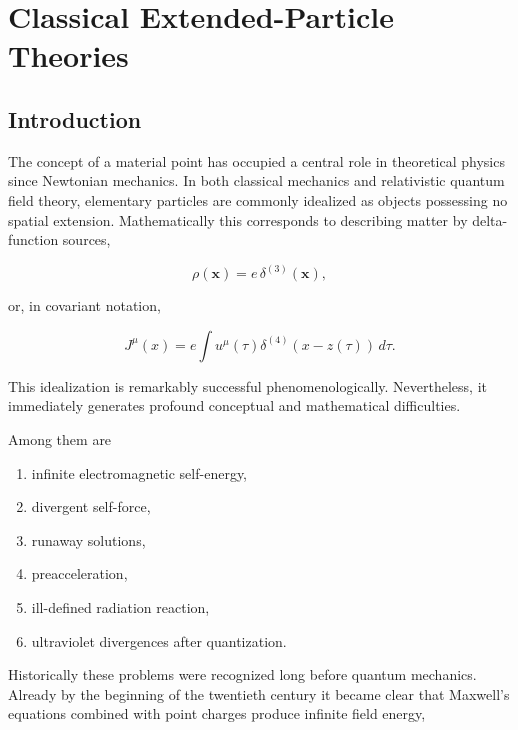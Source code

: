 \chapter{Classical Extended-Particle Theories}

\section{Introduction}

The concept of a material point has occupied a central role in theoretical
physics since Newtonian mechanics. In both classical mechanics and
relativistic quantum field theory, elementary particles are commonly idealized
as objects possessing no spatial extension. Mathematically this corresponds to
describing matter by delta-function sources,

\begin{equation}
\rho(\mathbf x)=e\,\delta^{(3)}(\mathbf x),
\end{equation}

or, in covariant notation,

\begin{equation}
J^\mu(x)
=
e
\int
u^\mu(\tau)
\delta^{(4)}
(x-z(\tau))
\,d\tau .
\end{equation}

This idealization is remarkably successful phenomenologically.
Nevertheless, it immediately generates profound conceptual and mathematical
difficulties.

Among them are

\begin{enumerate}
\item infinite electromagnetic self-energy,

\item divergent self-force,

\item runaway solutions,

\item preacceleration,

\item ill-defined radiation reaction,

\item ultraviolet divergences after quantization.
\end{enumerate}

Historically these problems were recognized long before quantum mechanics.
Already by the beginning of the twentieth century it became clear that
Maxwell's equations combined with point charges produce infinite field energy,

